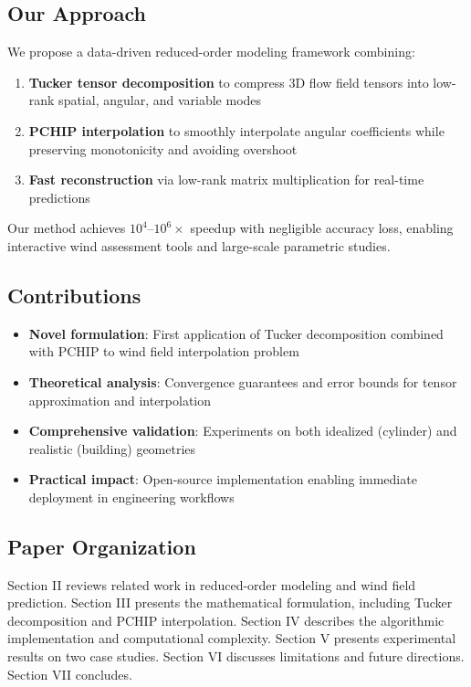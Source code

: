 \documentclass[conference]{IEEEtran}
\begin{document}
\subsection{Our Approach}

We propose a data-driven reduced-order modeling framework combining:

\begin{enumerate}
    \item \textbf{Tucker tensor decomposition} to compress 3D flow field tensors into low-rank spatial, angular, and variable modes
    \item \textbf{PCHIP interpolation} to smoothly interpolate angular coefficients while preserving monotonicity and avoiding overshoot
    \item \textbf{Fast reconstruction} via low-rank matrix multiplication for real-time predictions
\end{enumerate}

Our method achieves $10^4$--$10^6\times$ speedup with negligible accuracy loss, enabling interactive wind assessment tools and large-scale parametric studies.

\subsection{Contributions}

\begin{itemize}
    \item \textbf{Novel formulation}: First application of Tucker decomposition combined with PCHIP to wind field interpolation problem
    \item \textbf{Theoretical analysis}: Convergence guarantees and error bounds for tensor approximation and interpolation
    \item \textbf{Comprehensive validation}: Experiments on both idealized (cylinder) and realistic (building) geometries
    \item \textbf{Practical impact}: Open-source implementation enabling immediate deployment in engineering workflows
\end{itemize}

\subsection{Paper Organization}

Section II reviews related work in reduced-order modeling and wind field prediction. Section III presents the mathematical formulation, including Tucker decomposition and PCHIP interpolation. Section IV describes the algorithmic implementation and computational complexity. Section V presents experimental results on two case studies. Section VI discusses limitations and future directions. Section VII concludes.
\end{document}
